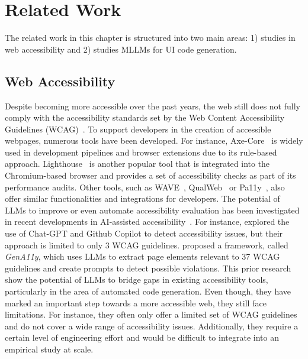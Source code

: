 \chapter{Related Work}\label{chapter:RelatedWork}
The related work in this chapter is structured into 
two main areas: 1) studies in web accessibility and 
2) studies MLLMs for UI code generation.


\section{Web Accessibility}
Despite becoming more accessible over the past years,
the web still does not fully comply with the accessibility standards 
set by the Web Content Accessibility Guidelines (WCAG)~\parencite{wcag21}.
To support developers in the creation of accessible webpages, 
numerous tools have been developed. For instance, 
Axe-Core~\parencite{axe-core} is widely used in development 
pipelines and browser extensions due to its rule-based approach.
Lighthouse~\parencite{lighthouse} is another popular tool that 
is integrated into the Chromium-based browser and provides 
a set of accessibility checks as part of its performance audits.
Other tools, such as WAVE~\parencite{web:wave}, QualWeb~\parencite{web:qualweb} or
Pa11y~\parencite{web:pa11y}, also offer similar functionalities and 
integrations for developers.\newline 
The potential of LLMs to improve or even automate accessibility evaluation 
has been investigated in recent developments in AI-assisted 
accessibility~\cite{cali2025prototype, duarte2025expanding,mowar2025codea11y}.
For instance, \textcite{lopez2025turning} explored the use of 
Chat-GPT and Github Copilot to detect accessibility issues, 
but their approach is limited to only 3 WCAG guidelines. 
\textcite{he2025enhancing} proposed a framework, called 
\textit{GenA11y}, which uses LLMs to extract page elements 
relevant to 37 WCAG guidelines and create prompts to 
detect possible violations. This prior research show 
the potential of LLMs to bridge gaps in existing 
accessibility tools, particularly in the area of 
automated code generation. Even though, they have 
marked an important step towards a more accessible web, they 
still face limitations. For instance, they often only offer 
a limited set of WCAG guidelines and do not cover 
a wide range of accessibility issues. Additionally, they 
require a certain level of engineering effort and would 
be difficult to integrate into an empirical study at scale.\newline



